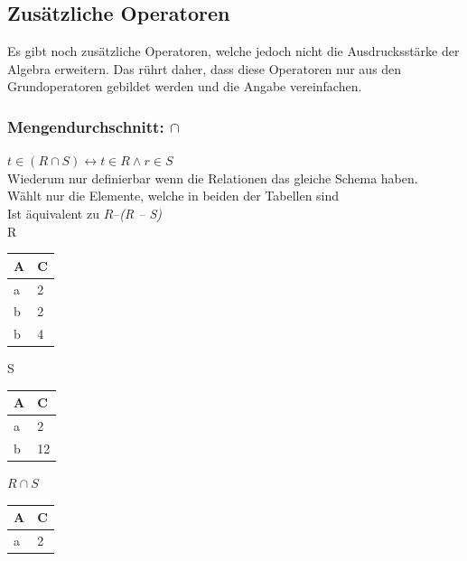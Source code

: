 \documentclass{article}
\begin{document}
 	\subsection{Zusätzliche Operatoren}
 	Es gibt noch zusätzliche Operatoren, welche jedoch nicht die Ausdrucksstärke der Algebra erweitern. Das rührt daher, dass diese Operatoren nur aus den Grundoperatoren gebildet werden und die Angabe vereinfachen.
 	\subsubsection{Mengendurchschnitt: \texorpdfstring{$\cap$}{}}
		$t\in (R\cap S) \leftrightarrow t\in R \land r\in S$ \\
 		Wiederum nur definierbar wenn die Relationen das gleiche Schema haben. \\
 		Wählt nur die Elemente, welche in beiden der Tabellen sind \\
 		Ist äquivalent zu $R$--\textit{(R -- S)} \\
 	R
 	\begin{tabular}{| l | l |}
 		\toprule
 		A & C \\ \midrule
 		a & 2 \\
 		b & 2 \\
 		b & 4 \\
 		\bottomrule
 \end{tabular} \hspace{0.5cm}
 S
 \begin{tabular}{| l | l |}
 		\toprule
 		A & C  \\ \midrule
 		a & 2 \\
 		b & 12 \\
 		\bottomrule
 \end{tabular} \hspace{0.5cm}
 $R \cap S$
 \begin{tabular}{| l | l |}
 		\toprule
 		A & C  \\ \midrule
 		a & 2 \\
 		\bottomrule
 \end{tabular}
\end{document}
